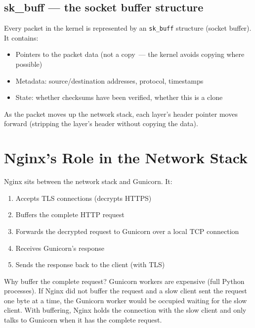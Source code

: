 \subsection*{sk\_buff --- the socket buffer structure}\label{26-network-stack-flow:sk-buff--the-socket-buffer-structure}

Every packet in the kernel is represented by an \texttt{sk\_buff} structure (socket buffer). It contains:

\begin{itemize}
\tightlist
\item
  Pointers to the packet data (not a copy~--- the kernel avoids copying where possible)
\item
  Metadata: source/destination addresses, protocol, timestamps
\item
  State: whether checksums have been verified, whether this is a clone
\end{itemize}

\noindent{}As the packet moves up the network stack, each layer's header pointer moves forward (stripping the layer's header without copying the data).

\setcounter{section}{5}
\section{Nginx's Role in the Network Stack}\label{26-network-stack-flow:266-nginxs-role-in-the-network-stack}

Nginx sits between the network stack and Gunicorn. It:

\begin{enumerate}
\def\labelenumi{\arabic{enumi}.}
\tightlist
\item
  Accepts TLS connections (decrypts HTTPS)
\item
  Buffers the complete HTTP request
\item
  Forwards the decrypted request to Gunicorn over a local TCP connection
\item
  Receives Gunicorn's response
\item
  Sends the response back to the client (with TLS)
\end{enumerate}

\noindent{}Why buffer the complete request? Gunicorn workers are expensive (full Python processes). If Nginx did not buffer the request and a slow client sent the request one byte at a time, the Gunicorn worker would be occupied waiting for the slow client. With buffering, Nginx holds the connection with the slow client and only talks to Gunicorn when it has the complete request.


